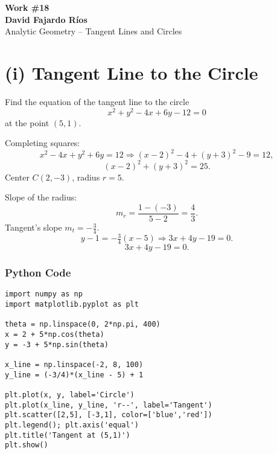 \documentclass[10pt,twocolumn]{article}
\begin{document}
\begin{center}
{\LARGE \textbf{Work \#18}}\\[4pt]
\textbf{David Fajardo Ríos}\\[8pt]
{\small Analytic Geometry – Tangent Lines and Circles}
\end{center}

\smallskip

\section*{(i) Tangent Line to the Circle}

\begin{tcolorbox}
Find the equation of the tangent line to the circle
\[
x^{2}+y^{2}-4x+6y-12=0
\]
at the point $(5,1)$.
\end{tcolorbox}

Completing squares:
\[
x^{2}-4x+y^{2}+6y=12 \Rightarrow (x-2)^{2}-4+(y+3)^{2}-9=12,
\]
\[
(x-2)^{2}+(y+3)^{2}=25.
\]
Center \(C(2,-3)\), radius \(r=5.\)

Slope of the radius:
\[
m_r = \frac{1-(-3)}{5-2} = \frac{4}{3}.
\]
Tangent’s slope \(m_t = -\frac{3}{4}\).
\[
y-1 = -\tfrac{3}{4}(x-5) \Rightarrow 3x + 4y - 19 = 0.
\]
\[
\boxed{3x + 4y - 19 = 0.}
\]

\begin{center}
\end{center}

\subsubsection*{Python Code}
\begin{verbatim}
import numpy as np
import matplotlib.pyplot as plt

theta = np.linspace(0, 2*np.pi, 400)
x = 2 + 5*np.cos(theta)
y = -3 + 5*np.sin(theta)

x_line = np.linspace(-2, 8, 100)
y_line = (-3/4)*(x_line - 5) + 1

plt.plot(x, y, label='Circle')
plt.plot(x_line, y_line, 'r--', label='Tangent')
plt.scatter([2,5], [-3,1], color=['blue','red'])
plt.legend(); plt.axis('equal')
plt.title('Tangent at (5,1)')
plt.show()
\end{verbatim}
\end{document}
